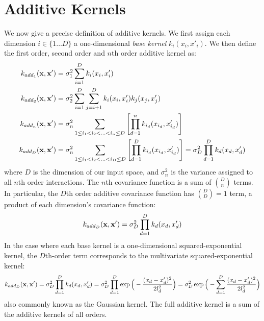 

\section{Additive Kernels}


We now give a precise definition of additive kernels.
We first assign each dimension $i \in \{1 \dots D\}$ a one-dimensional \emph{base kernel} $k_i(x_i, x'_i)$.
We then define the first order, second order and $n$th order additive kernel as:
%
\begin{align}
k_{add_1}({\bf x, x'}) & = \sigma_1^2 \sum_{i=1}^D k_i(x_i, x_i') \\
k_{add_2}({\bf x, x'}) & = \sigma_2^2 \sum_{i=1}^D \sum_{j = i + 1}^D k_i(x_i, x_i') k_j(x_j, x_j') \\
k_{add_n}({\bf x, x'}) & = \sigma_n^2 \sum_{1 \leq i_1 < i_2 < ... < i_n \leq D} \left[ \prod_{d=1}^n k_{i_d}(x_{i_d}, x_{i_d}') \right] \\
k_{add_D}({\bf x, x'}) & = \sigma_n^2 \sum_{1 \leq i_1 < i_2 < ... < i_D \leq D} \left[ \prod_{d=1}^D k_{i_d}(x_{i_d}, x_{i_d}') \right] = \sigma_D^2 \prod_{d=1}^D k_{d}(x_{d}, x_{d}')
\end{align}
%
where $D$ is the dimension of our input space, and $\sigma_n^2$ is the variance assigned to all $n$th order interactions.
The $n$th covariance function is a sum of ${D \choose n}$ terms.
In particular, the $D$th order additive covariance function has ${D \choose D} = 1$ term, a product of each dimension's covariance function:
%
\begin{align}
k_{add_D}({\bf x, x'}) = \sigma_D^2 \prod_{d=1}^D k_{d}(x_{d}, x_{d}')
\end{align}
%
In the case where each base kernel is a one-dimensional squared-exponential kernel, the $D$th-order term corresponds to the multivariate squared-exponential kernel:
%
\begin{align}
k_{add_D}({\bf x, x'}) = \sigma_D^2 \prod_{d=1}^D k_{d}(x_{d}, x_{d}') = \sigma_D^2 \prod_{d=1}^D \exp \Big( -\frac{ ( x_{d} - x_{d}')^2}{2l^2_d} \Big) = \sigma_D^2  \exp \Big( -\sum_{d=1}^D \frac{ ( x_{d} - x_{d}')^2}{2l^2_d} \Big)
%
\end{align}
also commonly known as the Gaussian kernel.
The full additive kernel is a sum of the additive kernels of all orders.



